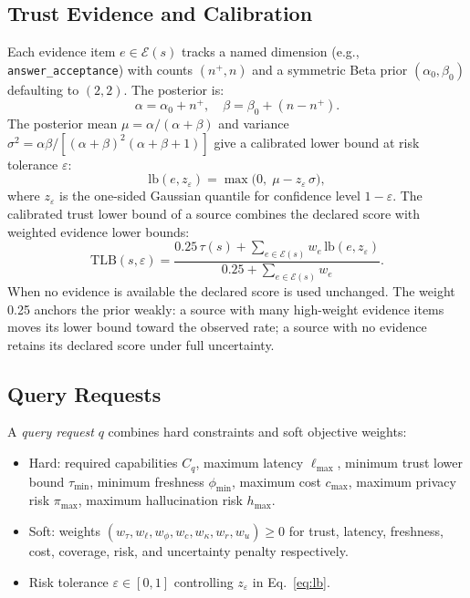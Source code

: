 \documentclass[runningheads]{llncs}
\begin{document}
\subsection{Trust Evidence and Calibration}
\label{sec:calibration}

Each evidence item $e \in \mathcal{E}(s)$ tracks a named dimension
(e.g., \texttt{answer\_acceptance}) with counts $(n^+, n)$ and a
symmetric Beta prior $(\alpha_0, \beta_0)$ defaulting to $(2,2)$.  The
posterior is:
\begin{equation}
  \alpha = \alpha_0 + n^+, \quad
  \beta  = \beta_0  + (n - n^+).
  \label{eq:beta}
\end{equation}
The posterior mean $\mu = \alpha/(\alpha+\beta)$ and variance
$\sigma^2 = \alpha\beta/[(\alpha+\beta)^2(\alpha+\beta+1)]$
give a calibrated lower bound at risk tolerance $\varepsilon$:
\begin{equation}
  \text{lb}(e, z_\varepsilon) =
    \max\!\bigl(0,\; \mu - z_\varepsilon\,\sigma\bigr),
  \label{eq:lb}
\end{equation}
where $z_\varepsilon$ is the one-sided Gaussian quantile for confidence
level $1-\varepsilon$.  The calibrated trust lower bound of a source
combines the declared score with weighted evidence lower bounds:
\begin{equation}
  \text{TLB}(s, \varepsilon) =
    \frac{0.25\,\tau(s) +
          \sum_{e \in \mathcal{E}(s)} w_e\,\text{lb}(e,z_\varepsilon)}
         {0.25 + \sum_{e \in \mathcal{E}(s)} w_e}.
  \label{eq:tlb}
\end{equation}
When no evidence is available the declared score is used unchanged.  The
weight 0.25 anchors the prior weakly: a source with many high-weight
evidence items moves its lower bound toward the observed rate; a source
with no evidence retains its declared score under full uncertainty.

\subsection{Query Requests}

A \emph{query request} $q$ combines hard constraints and soft objective
weights:
\begin{itemize}
  \item Hard: required capabilities $C_q$, maximum latency
    $\ell_{\max}$, minimum trust lower bound $\tau_{\min}$, minimum
    freshness $\phi_{\min}$, maximum cost $c_{\max}$, maximum privacy
    risk $\pi_{\max}$, maximum hallucination risk $h_{\max}$.
  \item Soft: weights
    $(w_\tau, w_\ell, w_\phi, w_c, w_\kappa, w_r, w_u) \geq 0$
    for trust, latency, freshness, cost, coverage, risk, and uncertainty
    penalty respectively.
  \item Risk tolerance $\varepsilon \in [0,1]$ controlling
    $z_\varepsilon$ in Eq.~\ref{eq:lb}.
\end{itemize}
\end{document}
